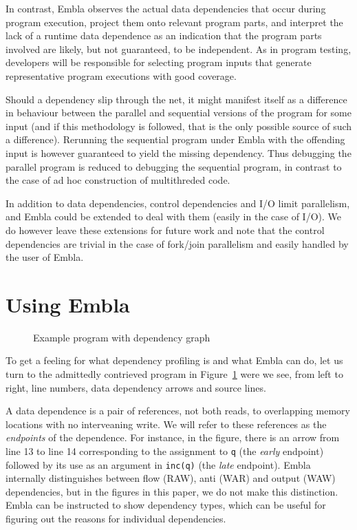 \documentclass{acm_proc_article-sp}
\begin{document}
In contrast, Embla
observes the actual data dependencies that occur during program
execution, project them onto relevant program parts, and interpret the
lack of a runtime data dependence as an indication that the program
parts involved are likely, but not guaranteed, to be independent.
As in program testing, developers will be responsible for selecting
program inputs that generate representative program executions with
good coverage.

Should a dependency slip through the net, it might manifest itself as a 
difference in behaviour between the parallel and sequential versions of the
program for some input (and if this methodology is followed, that is the only 
possible source of such a difference). Rerunning the sequential program under
Embla with the offending input is however guaranteed to yield the missing 
dependency.
Thus debugging the parallel program is reduced to debugging the sequential 
program, in contrast to the case of ad hoc construction of multithreded
code.

In addition to data dependencies, control dependencies and I/O limit parallelism,
and Embla could be extended to deal with them (easily in the case of I/O). We
do however leave these extensions for future work and note that the control
dependencies are trivial in the case of fork/join parallelism and easily handled 
by the user of Embla.



\section{Using Embla}

\begin{figure} 
\small

\caption{Example program with dependency graph} \label{ffirstex}
\end{figure}

To get a feeling for what dependency profiling is and what Embla can do, 
let us turn to the admittedly contrieved program in Figure~\ref{ffirstex}
were we see, from left to right, line numbers, data dependency 
arrows and source lines. 

A data dependence is a pair
of references, not both reads, to overlapping memory
locations with no interveaning write. We will refer to these
references as the {\em endpoints} of the dependence.
For instance, in the figure, 
there is an arrow from line 13 to line 14 corresponding to
the assignment to {\tt q} (the {\em early} endpoint) followed by its use 
as an argument in {\tt inc(q)} (the {\em late} endpoint). Embla
internally distinguishes between flow (RAW), anti (WAR) and output (WAW) 
dependencies, but in the figures in this paper, we do not make this
distinction. Embla can be instructed to show dependency types, which can be
useful for figuring out the reasons for individual dependencies.
\end{document}
